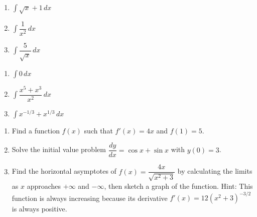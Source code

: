 \documentclass[11pt]{article}
\newcommand{\ds}{\displaystyle}
\begin{document}
\begin{multicols}{3}
\begin{enumerate}
\setcounter{enumi}{\theenumCount}
\item $\ds \int \sqrt{x} + 1\, dx$
\item $\ds \int \dfrac{1}{x^2}\, dx$
\item $\ds \int \dfrac{5}{\sqrt{x}}\, dx$
\setcounter{enumCount}{\theenumi}
\end{enumerate}
\end{multicols}
\vfill

\newpage

\begin{multicols}{3}
\begin{enumerate}
\setcounter{enumi}{\theenumCount}
\item $\ds \int 0\, dx$
\item $\ds \int \dfrac{x^5 + x^3}{x^2}\, dx$
\item $\ds \int x^{-1/3} + x^{1/3}\, dx$
\setcounter{enumCount}{\theenumi}
\end{enumerate}
\end{multicols}
\vfill

\begin{enumerate}
\setcounter{enumi}{\theenumCount}
\item Find a function $f(x)$ such that $f'(x) = 4x$ and $f(1) = 5$. 
\vfill
\item Solve the initial value problem $\dfrac{dy}{dx} = \cos x + \sin x$ with $y(0) = 3$. 
\vfill

\item Find the horizontal asymptotes of $f(x) = \dfrac{4x}{\sqrt{x^2 + 3}}$ by calculating the limits as $x$ approaches $+\infty$ and $-\infty$, then sketch a graph of the function.  Hint: This function is always increasing because its derivative $f'(x) = 12(x^2 + 3)^{-3/2}$ is always positive.  
\vfill
\setcounter{enumCount}{\theenumi}
\end{enumerate}
\end{document}
